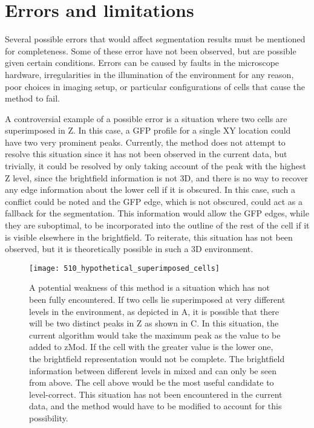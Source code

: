 \section{Errors and limitations}

Several possible errors that would affect segmentation results must be mentioned for completeness. Some of these error have not been observed, but are possible given certain conditions. Errors can be caused by faults in the microscope hardware, irregularities in the illumination of the environment for any reason, poor choices in imaging setup, or particular configurations of cells that cause the method to fail.

A controversial example of a possible error is a situation where two cells are superimposed in Z. In this case, a GFP profile for a single XY location could have two very prominent peaks. Currently, the method does not attempt to resolve this situation since it has not been observed in the current data, but trivially, it could be resolved by only taking account of the peak with the highest Z level, since the brightfield information is not 3D, and there is no way to recover any edge information about the lower cell if it is obscured. In this case, such a conflict could be noted and the GFP edge, which is not obscured, could act as a fallback for the segmentation. This information would allow the GFP edges, while they are suboptimal, to be incorporated into the outline of the rest of the cell if it is visible elsewhere in the brightfield. To reiterate, this situation has not been observed, but it is theoretically possible in such a 3D environment.

\begin{figure}[h!]
 \centering
 \texttt{[image: 510\_hypothetical\_superimposed\_cells]}
 \caption[Unaccounted for: superimposed cells]{
 	A potential weakness of this method is a situation which has not been fully encountered. If two cells lie superimposed at very different levels in the environment, as depicted in A, it is possible that there will be two distinct peaks in Z as shown in C. In this situation, the current algorithm would take the maximum peak as the value to be added to zMod. If the cell with the greater value is the lower one, the brightfield representation would not be complete. The brightfield information between different levels in mixed and can only be seen from above. The cell above would be the most useful candidate to level-correct. This situation has not been encountered in the current data, and the method would have to be modified to account for this possibility.
 }
 \label{fig:superimposedcells}
\end{figure}


